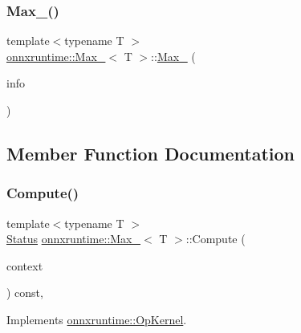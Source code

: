 \subsubsection{\texorpdfstring{Max\+\_()}{Max\_8()}}
{\footnotesize\ttfamily template$<$typename T $>$ \\
\mbox{\hyperlink{classonnxruntime_1_1Max__8}{onnxruntime\+::\+Max\+\_}}$<$ T $>$\+::\mbox{\hyperlink{classonnxruntime_1_1Max__8}{Max\+\_}} (\begin{DoxyParamCaption}\item[{const \mbox{\hyperlink{classonnxruntime_1_1OpKernelInfo}{Op\+Kernel\+Info}} \&}]{info }\end{DoxyParamCaption})\hspace{0.3cm}{\ttfamily [inline]}}



\subsection{Member Function Documentation}
\mbox{\label{classonnxruntime_1_1Max__8_a85e0e730c4d7b14e86e876f669857ad4}} 
\subsubsection{\texorpdfstring{Compute()}{Compute()}\hspace{0.1cm}{\footnotesize\ttfamily [1/2]}}
{\footnotesize\ttfamily template$<$typename T $>$ \\
\mbox{\hyperlink{classonnxruntime_1_1common_1_1Status}{Status}} \mbox{\hyperlink{classonnxruntime_1_1Max__8}{onnxruntime\+::\+Max\+\_}}$<$ T $>$\+::Compute (\begin{DoxyParamCaption}\item[{\mbox{\hyperlink{classonnxruntime_1_1OpKernelContext}{Op\+Kernel\+Context}} $\ast$}]{context }\end{DoxyParamCaption}) const\hspace{0.3cm}{\ttfamily [override]}, {\ttfamily [virtual]}}



Implements \mbox{\hyperlink{classonnxruntime_1_1OpKernel_a9eca8656a78b1b3ab9d3351a12798650}{onnxruntime\+::\+Op\+Kernel}}.

\mbox{\label{classonnxruntime_1_1Max__8_a26b6cd6fce65849eab03bd3979782167}} 
